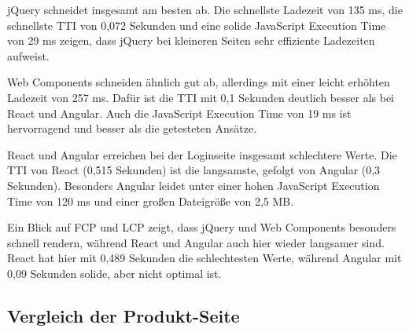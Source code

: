 \documentclass[oneside]{ausarbeitung}
\begin{document}
jQuery schneidet insgesamt am besten ab. Die schnellste Ladezeit von 135 ms, die schnellste TTI von 0,072 Sekunden und eine solide JavaScript Execution Time von 29 ms zeigen, dass jQuery bei kleineren Seiten sehr effiziente Ladezeiten aufweist.

Web Components schneiden ähnlich gut ab, allerdings mit einer leicht erhöhten Ladezeit von 257 ms. Dafür ist die TTI mit 0,1 Sekunden deutlich besser als bei React und Angular. Auch die JavaScript Execution Time von 19 ms ist hervorragend und besser als die getesteten Ansätze.

React und Angular erreichen bei der Loginseite insgesamt schlechtere Werte. Die TTI von React (0,515 Sekunden) ist die langsamste, gefolgt von Angular (0,3 Sekunden). Besonders Angular leidet unter einer hohen JavaScript Execution Time von 120 ms und einer großen Dateigröße von 2,5 MB.

Ein Blick auf FCP und LCP zeigt, dass jQuery und Web Components besonders schnell rendern, während React und Angular auch hier wieder langsamer sind. React hat hier mit 0,489 Sekunden die schlechtesten Werte, während Angular mit 0,09 Sekunden solide, aber nicht optimal ist.
\subsection{Vergleich der Produkt-Seite}
\end{document}
